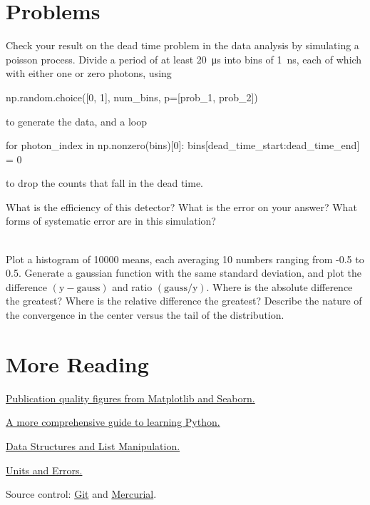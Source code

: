 \documentclass[justified, nobib]{tufte-handout}
\newcommand{\listTutorialLink}
  {https://docs.python.org/2/tutorial/datastructures.html}
\newcommand{\pintLink}{http://pint.readthedocs.org/en/0.6/}
\newcommand{\hgLink}{http://mercurial.selenic.com/}
\newcommand{\gitLink}{http://git-scm.com/}
\newcommand{\lambdaTutorialLink}
  {https://pythonconquerstheuniverse.wordpress.com/2011/08/29/lambda_tutorial/}
\newcommand{\functionalProgrammingLink}
  {http://www.ibm.com/developerworks/library/l-prog/}
\begin{document}
\section*{Problems}


\noindent
Check your result on the dead time problem in the data analysis by simulating a poisson process.
Divide a period of at least \SI{20}{\micro\second} into bins of \SI{1}{\nano\second}, each of which with either one or zero photons, using
\begin{pythoncode}
        np.random.choice([0, 1], num_bins, p=[prob_1, prob_2])
\end{pythoncode}
to generate the data, and a loop
\begin{pythoncode}
        for photon_index in np.nonzero(bins)[0]:
            bins[dead_time_start:dead_time_end] = 0
\end{pythoncode}
to drop the counts that fall in the dead time.

\noindent
What is the efficiency of this detector?
What is the error on your answer?
What forms of systematic error are in this simulation?

 \\
Plot a histogram of 10000 means, each averaging 10 numbers ranging from -0.5 to 0.5.
Generate a gaussian function with the same standard deviation, and plot the difference $(\text{y} - \text{gauss})$ and ratio $(\text{gauss} / \text{y})$.
Where is the absolute difference the greatest?
Where is the relative difference the greatest?
Describe the nature of the convergence in the center versus the tail of the distribution.

\pagebreak

\section*{More Reading}
\begin{description}
\item \href{http://www.jesshamrick.com/2016/04/13/reproducible-plots/}{Publication quality figures from Matplotlib and Seaborn.}

\item \href{http://learnpythonthehardway.org/book/}{A more comprehensive guide to learning Python.}

\item \href{\listTutorialLink}{Data Structures and List Manipulation.}

\item \href{\pintLink}{Units and Errors.}

\item Source control: \href{\gitLink}{Git} and \href{\hgLink}{Mercurial}.


\end{description}
\end{document}
